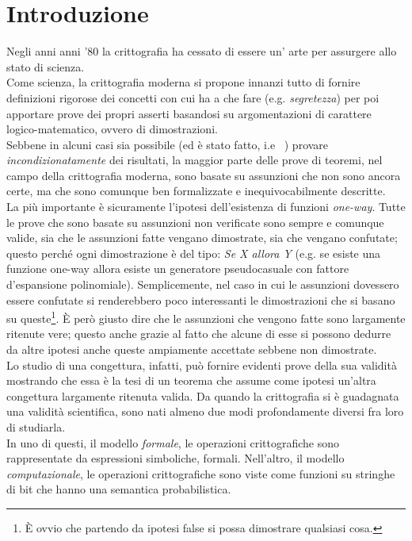 \documentclass[a4paper,openright,twoside,12pt]{report}
\author{Gian Pietro Farina}
\begin{document}
\chapter*{Introduzione}
Negli anni anni '80 la crittografia ha cessato di essere un' arte per assurgere allo stato di scienza. \\Come scienza, la crittografia moderna
si propone innanzi tutto di fornire definizioni rigorose dei concetti con cui ha a che fare (e.g. \emph{segretezza}) per poi apportare prove dei propri asserti basandosi 
su argomentazioni di carattere logico-matematico, ovvero di dimostrazioni. \\
Sebbene in alcuni casi sia possibile (ed \`e stato fatto, i.e ~\cite{Shannon}) provare \emph{incondizionatamente} dei risultati, la maggior parte delle prove di teoremi, nel campo 
della crittografia moderna, sono basate su assunzioni che non sono ancora certe, ma che sono comunque ben formalizzate e inequivocabilmente descritte.\\La pi\`u importante \`e sicuramente
l'ipotesi dell'esistenza di funzioni \emph{one-way}. Tutte le prove che sono basate su assunzioni non verificate sono sempre e comunque valide, sia che le assunzioni fatte vengano dimostrate,
sia che vengano confutate; questo perch\'e ogni dimostrazione \`e del tipo: \emph{Se X allora Y} (e.g. se esiste una funzione one-way allora esiste un generatore pseudocasuale con fattore
d'espansione polinomiale). Semplicemente, nel caso in cui le assunzioni dovessero essere confutate si renderebbero poco interessanti le dimostrazioni che si basano su queste\footnote{\`E ovvio che partendo da ipotesi false si possa
dimostrare qualsiasi cosa.}.
\`E per\`o giusto dire che le assunzioni che vengono fatte sono largamente ritenute vere; questo anche  grazie al fatto che alcune di esse si possono dedurre da altre ipotesi 
anche queste ampiamente accettate sebbene non dimostrate.\\Lo studio di una congettura, infatti, pu\`o fornire evidenti prove della sua validit\`a mostrando che essa \`e la tesi di un teorema che assume come ipotesi
un'altra congettura largamente ritenuta valida.
Da quando la crittografia si \`e guadagnata una validit\`a scientifica, sono nati almeno due modi profondamente diversi fra loro di
studiarla.\\In uno di questi, il modello \emph{formale}, le operazioni crittografiche sono rappresentate da espressioni simboliche, formali.
Nell'altro, il modello \emph{computazionale}, le operazioni crittografiche sono viste come funzioni su stringhe di bit che hanno una semantica probabilistica.
\end{document}
